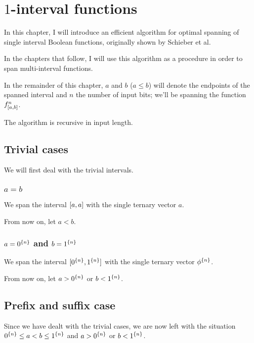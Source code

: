 \chapter{\texorpdfstring{$1$}{1}-interval functions}
\label{chap:1interval}

In this chapter,
I will introduce an efficient algorithm
for optimal spanning
of single interval Boolean functions,
originally shown by Schieber et al.\cite{Schieber2005154}

In the chapters that follow,
I will use this algorithm as a procedure
in order to span multi-interval functions.

In the remainder of this chapter,
$a$ and $b$ ($a \leq b$) will denote the endpoints
of the spanned interval
and $n$ the number of input bits;
we'll be spanning the function $f^{n}_{[a, b]}$.

The algorithm is recursive in input length.

\section{Trivial cases}

We will first deal with the trivial intervals.

\subsection{\texorpdfstring{$a = b$}{a = b}}

We span the interval $[a, a]$
with the single ternary vector $a$.

From now on,
let $a < b$.

\subsection{\texorpdfstring{$a = 0^{\{n\}}$}{a = 0...0}
and
\texorpdfstring{$b = 1^{\{n\}}$}{b = 1...1}
}

We span the interval
$[0^{\{n\}}, 1^{\{n\}}]$
with the single ternary vector $\phi^{\{n\}}$.

From now on,
let $a > 0^{\{n\}}$ or $b < 1^{\{n\}}$.

\section{Prefix and suffix case}
\label{sec:prefixsuffix}

Since we have dealt with the trivial cases,
we are now left with the situation
$0^{\{n\}} \leq a < b \leq 1^{\{n\}}$
and
$a > 0^{\{n\}}$ or $b < 1^{\{n\}}$.

